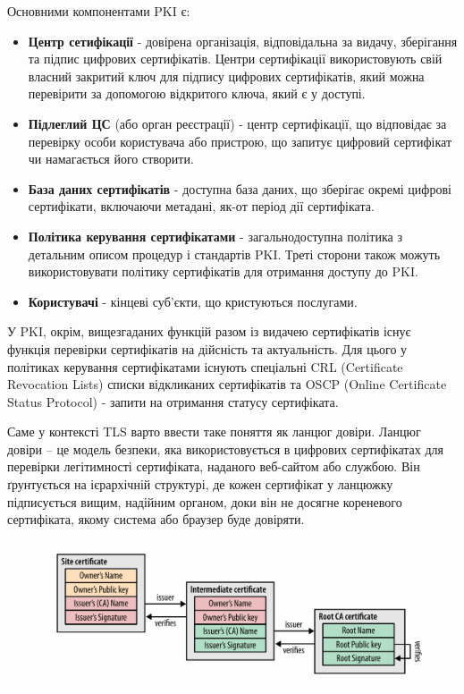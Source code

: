  Основними компонентами PKI є:
 \begin{itemize}
     \item \textbf{Центр сетифікації} - довірена організація, відповідальна за видачу, зберігання та підпис цифрових сертифікатів. Центри сертифікації використовують свій власний закритий ключ для підпису цифрових сертифікатів, який можна перевірити за допомогою відкритого ключа, який є у доступі.
     \item \textbf{Підлеглий ЦС} (або орган реєстрації) - центр сертифікації, що відповідає за перевірку особи користувача або пристрою, що запитує цифровий сертифікат чи намагається його створити.
     \item \textbf{База даних сертифікатів} - доступна база даних, що зберігає окремі цифрові сертифікати, включаючи метадані, як-от період дії сертифіката.
     \item \textbf{Політика керування сертифікатами} - загальнодоступна політика з детальним описом процедур і стандартів PKI. Треті сторони також можуть використовувати політику сертифікатів для отримання доступу до PKI.
     \item \textbf{Користувачі} - кінцеві суб'єкти, що кристуються послугами.
 \end{itemize}

У PKI, окрім, вищезгаданих функцій разом із видачею сертифікатів існує функція перевірки сертифікатів на дійсність та актуальність. Для цього у політиках керування сертифікатами існують спеціальні CRL (Certificate Revocation Lists) списки відкликаних сертифікатів та OSCP (Online Certificate Status Protocol) - запити на отримання статусу сертифіката.

Саме у контексті TLS варто ввести таке поняття як ланцюг довіри. Ланцюг довіри – це модель безпеки, яка використовується в цифрових сертифікатах для перевірки легітимності сертифіката, наданого веб-сайтом або службою. Він ґрунтується на ієрархічній структурі, де кожен сертифікат у ланцюжку підписується вищим, надійним органом, доки він не досягне кореневого сертифіката, якому система або браузер буде довіряти. 

\begin{figure}[ht]
        \centering
        \includegraphics[scale=0.35]{../IMAGES/certificate_chain.png}
        \label{certificate_chain}
\end{figure}

